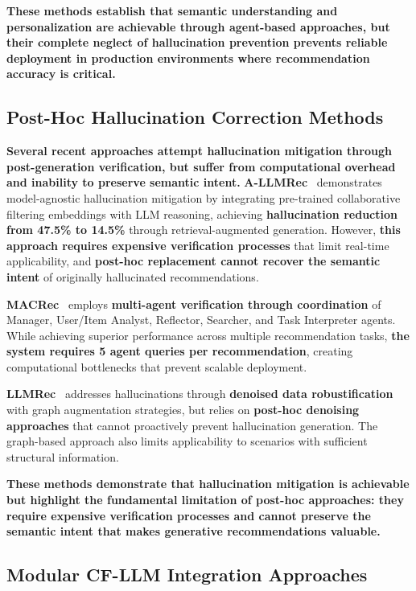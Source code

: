 \documentclass[acmsmall]{acmart}
\begin{document}
\textbf{These methods establish that semantic understanding and personalization are achievable through agent-based approaches, but their complete neglect of hallucination prevention prevents reliable deployment in production environments where recommendation accuracy is critical.}

\subsection{Post-Hoc Hallucination Correction Methods}

\textbf{Several recent approaches attempt hallucination mitigation through post-generation verification, but suffer from computational overhead and inability to preserve semantic intent.} \textbf{A-LLMRec}~\cite{li2024allm} demonstrates model-agnostic hallucination mitigation by integrating pre-trained collaborative filtering embeddings with LLM reasoning, achieving \textbf{hallucination reduction from 47.5\% to 14.5\%} through retrieval-augmented generation. However, \textbf{this approach requires expensive verification processes} that limit real-time applicability, and \textbf{post-hoc replacement cannot recover the semantic intent} of originally hallucinated recommendations.

\textbf{MACRec}~\cite{wang2024macrec} employs \textbf{multi-agent verification through coordination} of Manager, User/Item Analyst, Reflector, Searcher, and Task Interpreter agents. While achieving superior performance across multiple recommendation tasks, \textbf{the system requires 5 agent queries per recommendation}, creating computational bottlenecks that prevent scalable deployment.

\textbf{LLMRec}~\cite{liao2024llmrec} addresses hallucinations through \textbf{denoised data robustification} with graph augmentation strategies, but relies on \textbf{post-hoc denoising approaches} that cannot proactively prevent hallucination generation. The graph-based approach also limits applicability to scenarios with sufficient structural information.

\textbf{These methods demonstrate that hallucination mitigation is achievable but highlight the fundamental limitation of post-hoc approaches: they require expensive verification processes and cannot preserve the semantic intent that makes generative recommendations valuable.}

\subsection{Modular CF-LLM Integration Approaches}
\end{document}
